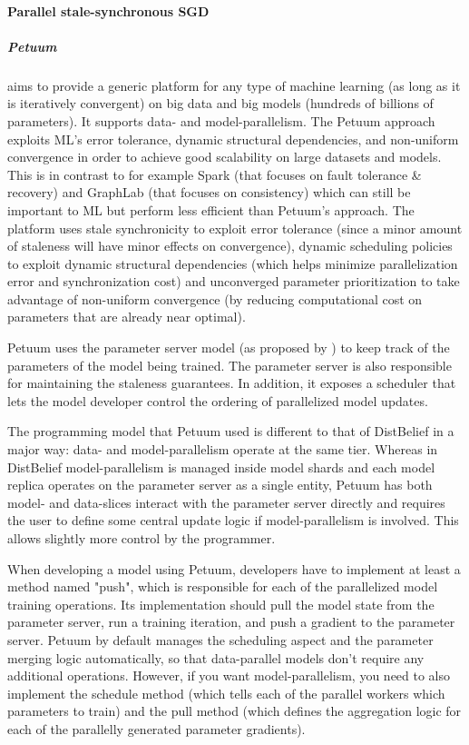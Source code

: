 \paragraph{Parallel stale-synchronous SGD}

\subparagraph{Petuum \citep{Xing2013}}
aims to provide a generic platform for any type of machine learning (as long as it is iteratively convergent) on big data and big models (hundreds of billions of parameters). It supports data- and model-parallelism. The Petuum approach exploits ML’s error tolerance, dynamic structural dependencies, and non-uniform convergence in order to achieve good scalability on large datasets and models. This is in contrast to for example Spark (that focuses on fault tolerance \& recovery) and GraphLab (that focuses on consistency) which can still be important to ML but perform less efficient than Petuum's approach. The platform uses stale synchronicity to exploit error tolerance (since a minor amount of staleness will have minor effects on convergence), dynamic scheduling policies to exploit dynamic structural dependencies (which helps minimize parallelization error and synchronization cost) and unconverged parameter prioritization to take advantage of non-uniform convergence (by reducing computational cost on parameters that are already near optimal). 

Petuum uses the parameter server model (as proposed by \citet{DistBelief2012}) to keep track of the parameters of the model being trained. The parameter server is also responsible for maintaining the staleness guarantees. In addition, it exposes a scheduler that lets the model developer control the ordering of parallelized model updates.

The programming model that Petuum used is different to that of DistBelief in a major way: data- and model-parallelism operate at the same tier. Whereas in DistBelief model-parallelism is managed inside model shards and each model replica operates on the parameter server as a single entity, Petuum has both model- and data-slices interact with the parameter server directly and requires the user to define some central update logic if model-parallelism is involved. This allows slightly more control by the programmer.

When developing a model using Petuum, developers have to implement at least a method named "push", which is responsible for each of the parallelized model training operations. Its implementation should pull the model state from the parameter server, run a training iteration, and push a gradient to the parameter server. Petuum by default manages the scheduling aspect and the parameter merging logic automatically, so that data-parallel models don’t require any additional operations. However, if you want model-parallelism, you need to also implement the schedule method (which tells each of the parallel workers which parameters to train) and the pull method (which defines the aggregation logic for each of the parallelly generated parameter gradients).

